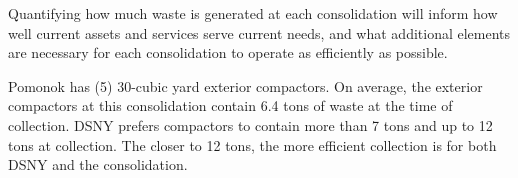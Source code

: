 
    Quantifying how much waste is generated at each consolidation will inform how well current assets and services serve current needs, and what additional elements are necessary for each consolidation to operate as efficiently as possible.
    
    Pomonok has (5) 30-cubic yard exterior compactors. On average, the exterior compactors at this consolidation contain 6.4 tons of waste at the time of collection. DSNY prefers compactors to contain more than 7 tons and up to 12 tons at collection. The closer to 12 tons, the more efficient collection is for both DSNY and the consolidation.